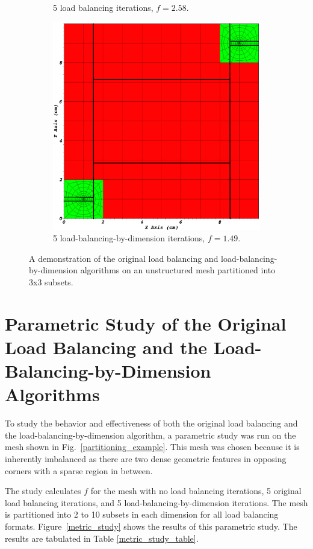 \begin{figure}[H]
\begin{subfigure}[b]{0.49\textwidth}
\caption{5 load balancing iterations, $f = 2.58$.}
\label{3x3_lb}
\end{subfigure}
\begin{subfigure}[b]{0.49\textwidth}
\centering
\includegraphics[scale=0.13]{../figures/ubp_3x3_lbd.png}
\caption{5 load-balancing-by-dimension iterations, $f = 1.49$.}
\label{3x3_lbd}
\end{subfigure}
\caption{A demonstration of the original load balancing and load-balancing-by-dimension algorithms on an unstructured mesh partitioned into 3x3 subsets.}
\label{alg_illustration}
\end{figure}

\section{Parametric Study of the Original Load Balancing and the Load-Balancing-by-Dimension Algorithms}
To study the behavior and effectiveness of both the original load balancing and the load-balancing-by-dimension algorithm, a parametric study was run on the mesh shown in Fig.~\ref{partitioning_example}.
This mesh was chosen because it is inherently imbalanced as there are two dense geometric features in opposing corners with a sparse region in between.

The study calculates $f$ for the mesh with no load balancing iterations, 5 original load balancing iterations, and 5 load-balancing-by-dimension iterations.
The mesh is partitioned into 2 to 10 subsets in each dimension for all load balancing formats.
Figure~\ref{metric_study} shows the results of this parametric study.
The results are tabulated in Table \ref{metric_study_table}.

